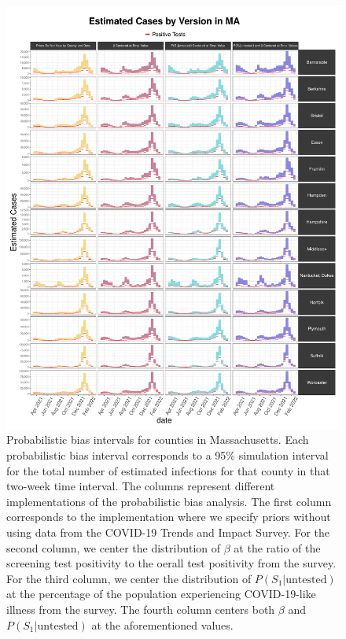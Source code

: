 \documentclass[12pt,twoside]{smiththesis}
\begin{document}
\begin{figure}
\includegraphics[width=1\linewidth]{figure/ma_pb_compared_to_observed} \caption{\label{fig:pb_counts_ma}Probabilistic bias intervals for counties in Massachusetts. Each probabilistic bias interval corresponds to a 95\% simulation interval for the total number of estimated infections for that county in that two-week time interval. The columns represent different implementations of the probabilistic bias analysis. The first column corresponds to the implementation where we specify priors without using data from the COVID-19 Trends and Impact Survey. For the second column, we center the distribution of $\beta$ at the ratio of the screening test positivity to the oerall test positivity from the survey. For the third column, we center the distribution of $P(S_1|\text{untested})$ at the percentage of the population experiencing COVID-19-like illness from the survey. The fourth column centers both  $\beta$ and $P(S_1|\text{untested})$ at the aforementioned values.}\label{fig:unnamed-chunk-18}
\end{figure}
\end{document}

